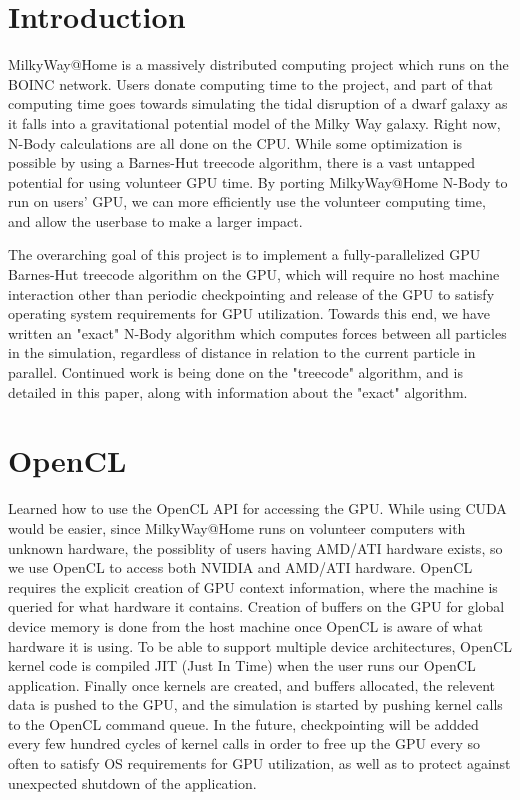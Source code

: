 \documentclass[fleqn,10pt]{SelfArx} %
\begin{document}
\section*{Introduction} %
MilkyWay@Home is a massively distributed computing project which runs on the BOINC network. Users donate computing time to the project, and part of that computing time goes towards simulating the tidal disruption of a dwarf galaxy as it falls into a gravitational potential model of the Milky Way galaxy. Right now, N-Body calculations are all done on the CPU. While some optimization is possible by using a Barnes-Hut treecode algorithm, there is a vast untapped potential for using volunteer GPU time. By porting MilkyWay@Home N-Body to run on users' GPU, we can more efficiently use the volunteer computing time, and allow the userbase to make a larger impact.

The overarching goal of this project is to implement a fully-parallelized GPU Barnes-Hut treecode algorithm on the GPU, which will require no host machine interaction other than periodic checkpointing and release of the GPU to satisfy operating system requirements for GPU utilization. Towards this end, we have written an "exact" N-Body algorithm which computes forces between all particles in the simulation, regardless of distance in relation to the current particle in parallel. Continued work is being done on the "treecode" algorithm, and is detailed in this paper, along with information about the "exact" algorithm.

\section{OpenCL}
Learned how to use the OpenCL API for accessing the GPU. While using CUDA would be easier, since MilkyWay@Home runs on volunteer computers with unknown hardware, the possiblity of users having AMD/ATI hardware exists, so we use OpenCL to access both NVIDIA and AMD/ATI hardware. OpenCL requires the explicit creation of GPU context information, where the machine is queried for what hardware it contains. Creation of buffers on the GPU for global device memory is done from the host machine once OpenCL is aware of what hardware it is using. To be able to support multiple device architectures, OpenCL kernel code is compiled JIT (Just In Time) when the user runs our OpenCL application. Finally once kernels are created, and buffers allocated, the relevent data is pushed to the GPU, and the simulation is started by pushing kernel calls to the OpenCL command queue. In the future, checkpointing will be addded every few hundred cycles of kernel calls in order to free up the GPU every so often to satisfy OS requirements for GPU utilization, as well as to protect against unexpected shutdown of the application.
\end{document}
